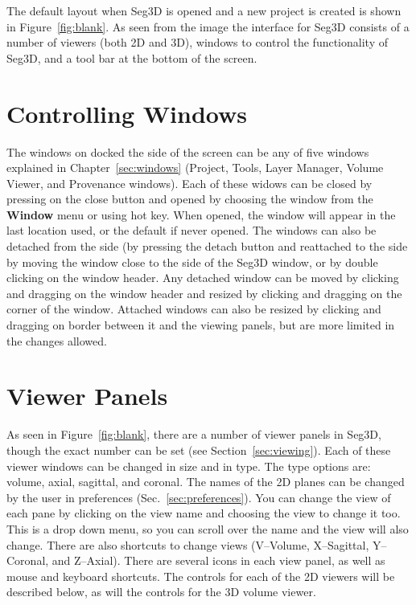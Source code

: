 \documentclass[fleqn,11pt,openany]{book}
\begin{document}
The default layout when Seg3D is opened and a new project is created is shown in Figure~\ref{fig:blank}.
As seen from the image the interface for Seg3D consists of a number of viewers (both 2D and 3D), windows to control the functionality of Seg3D, and a tool bar at the bottom of the screen.  

\section{Controlling Windows}
\label{sec:window_control}

The windows on docked the side of the screen can be any of five windows explained in Chapter~\ref{sec:windows} (Project, Tools, Layer Manager, Volume Viewer, and Provenance windows).
Each of these widows can be closed by pressing on the close button  and opened by choosing the window from the \textbf{Window} menu or using hot key.
When opened, the window will appear in the last location used, or the default if never opened.
The windows can also be detached from the side (by pressing the detach button  and reattached to the side by moving the window close to the side of the Seg3D window, or by double clicking on the window header.
Any detached window can be moved by clicking and dragging on the window header and resized by clicking and dragging on the corner of the window.
Attached windows can also be resized by clicking and dragging on border between it and the viewing panels, but are more limited in the changes allowed.  

\section{Viewer Panels}

As seen in Figure~\ref{fig:blank}, there are a number of viewer panels in Seg3D, though the exact number can be set (see Section~\ref{sec:viewing}).
Each of these viewer windows can be changed in size and in type.
The type options are: volume, axial, sagittal, and coronal.
The names of the 2D planes can be changed by the user in preferences (Sec.~\ref{sec:preferences}).
You can change the view of each pane by clicking on the view name and choosing the view to change it too.
This is a drop down menu, so you can scroll over the name and the view will also change.
There are also shortcuts to change views (V--Volume, X--Sagittal, Y--Coronal, and Z--Axial).
There are several icons in each view panel, as well as mouse and keyboard shortcuts.
The controls for each of the 2D viewers will be described below, as will the controls for the 3D volume viewer.
\end{document}
